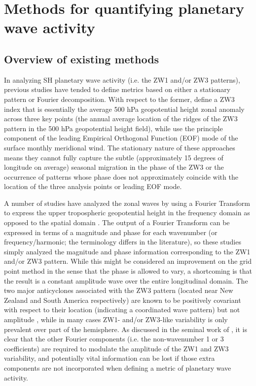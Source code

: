 \section{Methods for quantifying planetary wave activity}\label{s:methodology}

\subsection{Overview of existing methods}\label{s:existing_metrics}

In analyzing SH planetary wave activity (i.e. the ZW1 and/or ZW3 patterns), previous studies have tended to define metrics based on either a stationary pattern or Fourier decomposition. With respect to the former, \citet{Raphael2004} define a ZW3 index that is essentially the average 500 hPa geopotential height zonal anomaly across three key points (the annual average location of the ridges of the ZW3 pattern in the 500 hPa geopotential height field), while \citet{Yuan2008} use the principle component of the leading Empirical Orthogonal Function (EOF) mode of the surface monthly meridional wind. The stationary nature of these approaches means they cannot fully capture the subtle (approximately 15 degrees of longitude on average) seasonal migration in the phase of the ZW3 \citep{vanLoon1984,Mo1985} or the occurrence of patterns whose phase does not approximately coincide with the location of the three analysis points or leading EOF mode.

A number of studies have analyzed the zonal waves by using a Fourier Transform to express the upper tropospheric geopotential height in the frequency domain as opposed to the spatial domain \citep{Hobbs2007,Hobbs2010,Turner2013}. The output of a Fourier Transform can be expressed in terms of a magnitude and phase for each wavenumber (or frequency/harmonic; the terminology differs in the literature), so these studies simply analyzed the magnitude and phase information corresponding to the ZW1 and/or ZW3 pattern. While this might be considered an improvement on the grid point method in the sense that the phase is allowed to vary, a shortcoming is that the result is a constant amplitude wave over the entire longitudinal domain. The two major anticyclones associated with the ZW3 pattern (located near New Zealand and South America respectively) are known to be positively covariant with respect to their location (indicating a coordinated wave pattern) but not amplitude \citep{Hobbs2010}, while in many cases ZW1- and/or ZW3-like variability is only prevalent over part of the hemisphere. As discussed in the seminal work of \citet{vanLoon1972}, it is clear that the other Fourier components (i.e. the non-wavenumber 1 or 3 coefficients) are required to modulate the amplitude of the ZW1 and ZW3 variability, and potentially vital information can be lost if those extra components are not incorporated when defining a metric of planetary wave activity. 

